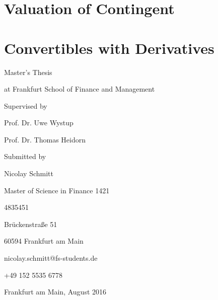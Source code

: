 \centerline{}
\centerline{}
\section*{\hfil Valuation of Contingent \hfil}
\section*{\hfil Convertibles with Derivatives \hfil}
\vfill
\vfill
\centerline{Master's Thesis}
\centerline{at Frankfurt School of Finance and Management}
\vfill
\vfill
\centerline{Supervised by}
\centerline{Prof. Dr. Uwe Wystup}
\centerline{Prof. Dr. Thomas Heidorn}
\vfill
\vfill
\centerline{Submitted by }
\centerline{Nicolay Schmitt}
\centerline{Master of Science in Finance 1421}
\centerline{4835451}
\centerline{Br\"uckenstra\ss{}e 51}
\centerline{60594 Frankfurt am Main}
\centerline{\Letter \phantom{a}nicolay.schmitt@fs-students.de}
\centerline{\Telefon \phantom{a}+49 152 5535 6778}
\centerline{Frankfurt am Main, August 2016}
\centerline{}
\centerline{}
